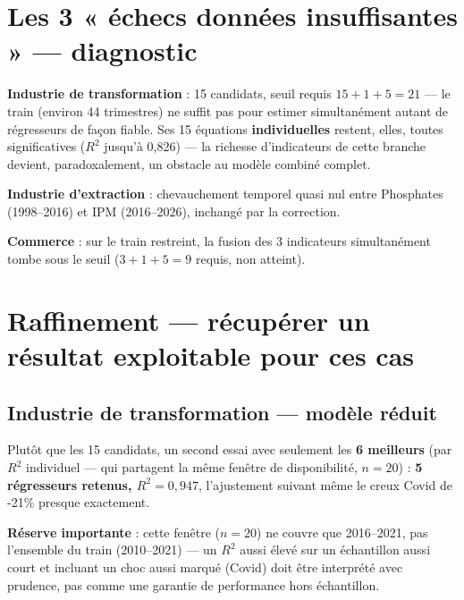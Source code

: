 \documentclass[11pt,a4paper]{article}
\begin{document}
\section{Les 3 « échecs données insuffisantes » --- diagnostic}

\textbf{Industrie de transformation} : 15 candidats, seuil requis $15+1+5=21$ --- le train (environ 44 trimestres) ne suffit pas pour estimer simultanément autant de régresseurs de façon fiable. Ses 15 équations \textbf{individuelles} restent, elles, toutes significatives ($R^2$ jusqu'à 0,826) --- la richesse d'indicateurs de cette branche devient, paradoxalement, un obstacle au modèle combiné complet.

\textbf{Industrie d'extraction} : chevauchement temporel quasi nul entre Phosphates (1998--2016) et IPM (2016--2026), inchangé par la correction.

\textbf{Commerce} : sur le train restreint, la fusion des 3 indicateurs simultanément tombe sous le seuil ($3+1+5=9$ requis, non atteint).

\section{Raffinement --- récupérer un résultat exploitable pour ces cas}

\subsection{Industrie de transformation --- modèle réduit}

\begin{resultatbox}
Plutôt que les 15 candidats, un second essai avec seulement les \textbf{6 meilleurs} (par $R^2$ individuel --- qui partagent la même fenêtre de disponibilité, $n=20$) : \textbf{5 régresseurs retenus, $R^2=0{,}947$}, l'ajustement suivant même le creux Covid de -21\% presque exactement.
\end{resultatbox}

\begin{alertebox}
\textbf{Réserve importante} : cette fenêtre ($n=20$) ne couvre que 2016--2021, pas l'ensemble du train (2010--2021) --- un $R^2$ aussi élevé sur un échantillon aussi court et incluant un choc aussi marqué (Covid) doit être interprété avec prudence, pas comme une garantie de performance hors échantillon.
\end{alertebox}
\end{document}
